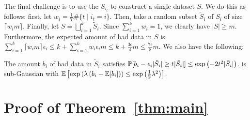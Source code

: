 \documentclass[anon,12pt]{colt2016} %
\begin{document}
The final challenge is to use the $S_{i_t}$ to construct a single dataset $S$. 
We do this as follows: first, let $w_i = \frac{1}{T}\#\{t \mid i_t = i\}$. Then, 
take a random subset $\tilde{S}_i$ of $S_i$ of size $\lceil w_im\rceil$. Finally, let 
$S = \bigsqcup_{i=1}^k \tilde{S}_i$. Since $\sum_{i=1}^k w_i = 1$, we clearly have $|S| \geq m$. 
Furthermore, the expected amount of bad data in $S$ is 
$\sum_{i=1}^k \lceil w_im\rceil \epsilon_i \leq k + \sum_{i=1}^k w_i\epsilon_i m 
\leq k + \frac{3\epsilon}{4} m \leq \frac{7\epsilon}{8} m$. We also have the following:
\begin{lemma}
The amount $b_i$ of bad data in $\tilde{S}_i$ satisfies 
$\mathbb{P}[b_i - \epsilon_i|\tilde{S}_i| \geq t|\tilde{S}_i|] \leq \exp\left(-2t^2|\tilde{S}_i|\right)$.
is sub-Gaussian with 
$\mathbb{E}\left[\exp\left(\lambda\left(b_i - \mathbb{E}[b_i]\right)\right) \leq \exp\left(\frac{1}{2}\lambda^2\right)\right]$.
\end{lemma}

\section{Proof of Theorem~\ref{thm:main}}
\label{sec:main-proof}

\acks{}



%
%
%
%
\end{document}
